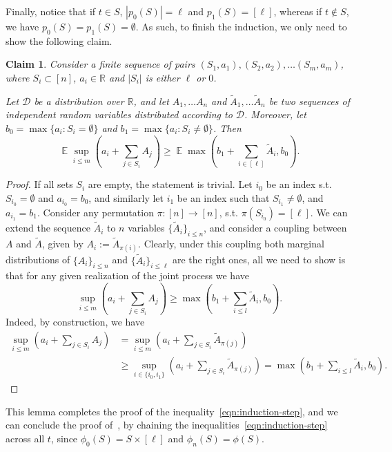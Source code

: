 \documentclass[10pt,a4paper]{article}
\DeclareMathOperator{\E}{\mathbb{E}}
\newcommand{\bR}{\mathbb{R}}
\newtheorem{claim}[theorem]{Claim}
\begin{document}
Finally, notice that if $t \in S$, $|p_0(S)| = \ell$ and $p_1(S) = [\ell]$, whereas if $t \not\in S$, we have $p_0(S) = p_1(S) = \emptyset$. As such, to finish the induction, we only need to show the following claim.
\begin{claim}
    Consider a finite sequence of pairs $(S_1, a_1), (S_2, a_2), \ldots (S_m, a_m)$, where $S_i \subset [n]$, $a_i \in \bR$ and $|S_i|$ is either $\ell$ or $0$.

    Let $\mathcal{D}$ be a distribution over $\mathbb{R}$, and let $A_1, \ldots A_n$ and $\tilde{A}_1, \ldots \tilde{A}_n$ be two sequences of independent random variables distributed according to $\mathcal{D}$. Moreover, let $b_0 = \max \{ a_i : S_i = \emptyset \}$ and $b_1 = \max \{a_i : S_i \not= \emptyset\}$. Then
    \begin{equation*}
        \E \sup_{i \leq m}(a_i + \sum_{j \in S_i} A_j) \geq \E \max(b_1 + \sum_{i \in [\ell]} \tilde{A}_i, b_0).
    \end{equation*}
\end{claim}
\begin{proof}
If all sets $S_i$ are empty, the statement is trivial. Let $i_0$ be an index s.t. $S_{i_0} = \emptyset$ and $a_{i_0} = b_0$, and similarly let $i_1$ be an index such that $S_{i_1} \not= \emptyset$, and $a_{i_1} = b_1$. Consider any permutation $\pi : [n] \to [n]$, s.t. $\pi(S_{i_0}) = [\ell]$. We can extend the sequence $\tilde{A}_i$ to $n$ variables $\{\tilde{A}_{i}\}_{i \leq n}$, and consider a coupling between $A$ and $\tilde{A}$, given by $A_{i} := \tilde{A}_{\pi(i)}$. Clearly, under this coupling both marginal distributions of $\{A_i\}_{i \leq n}$ and $\{\tilde{A}_i\}_{i \leq \ell}$ are the right ones, all we need to show is that for any given realization of the joint process we have
\begin{equation*}
    \sup_{i\leq m} (a_i + \sum_{j \in S_i} A_j) \geq \max(b_1 + \sum_{i \leq l} \tilde{A}_i, b_0).
\end{equation*}
Indeed, by construction, we have
\begin{align*}
    \sup_{i\leq m} (a_i + \sum_{j \in S_i} A_j) & = \sup_{i \leq m} (a_i + \sum_{j \in S_i} \tilde{A}_{\pi(j)}) \\
    & \geq \sup_{i \in \{i_0, i_1\} } (a_i + \sum_{j \in S_i} \tilde{A}_{\pi(j)}) = \max(b_1 + \sum_{i \leq l} \tilde{A}_i, b_0).
\end{align*}
\end{proof}
This lemma completes the proof of the inequality~\eqref{eqn:induction-step}, and we can conclude the proof of~, by chaining the inequalities~\eqref{eqn:induction-step} across all $t$, since $\phi_0(S) = S \times [\ell]$ and $\phi_n(S) = \phi(S)$.
\end{document}
